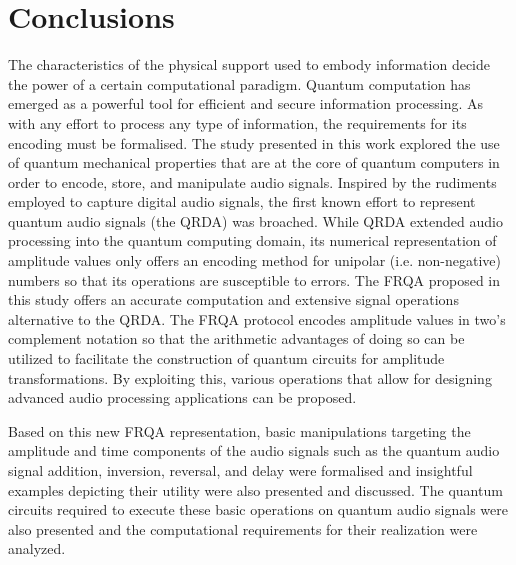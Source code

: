\documentclass[10pt,journal,compsoc]{IEEEtran}
\begin{document}

\section{Conclusions}\label{sec4}
The characteristics of the physical support used to embody information decide the power of a certain computational paradigm. Quantum computation has emerged as a powerful tool for efficient and secure information processing. As with any effort to process any type of information, the requirements for its encoding must be formalised. The study presented in this work explored the use of quantum mechanical properties that are at the core of quantum computers in order to encode, store, and manipulate audio signals. Inspired by the rudiments employed to capture digital audio signals, the first known effort to represent quantum audio signals (the QRDA) was broached. While QRDA extended audio processing into the quantum computing domain, its numerical representation of amplitude values only offers an encoding method for unipolar (i.e. non-negative) numbers so that its operations are susceptible to errors. The FRQA proposed in this study offers an accurate computation and extensive signal operations alternative to the QRDA. The FRQA protocol encodes amplitude values in two's complement notation so that the arithmetic advantages of doing so can be utilized to facilitate the construction of quantum circuits for amplitude transformations. By exploiting this, various operations that allow for designing advanced audio processing applications can be proposed.

Based on this new FRQA representation, basic manipulations targeting the amplitude and time components of the audio signals such as the quantum audio signal addition, inversion, reversal, and delay were formalised and insightful examples depicting their utility were also presented and discussed. The quantum circuits required to execute these basic operations on quantum audio signals were also presented and the computational requirements for their realization were analyzed.
\end{document}
